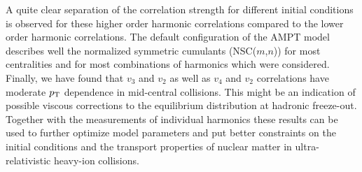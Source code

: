 A quite clear separation of the correlation strength for different initial conditions is observed for these higher order harmonic correlations compared to the lower order harmonic correlations.
The default configuration of the AMPT model describes well the normalized symmetric cumulants (NSC($m$,$n$)) for most centralities and for most combinations of harmonics which were considered. %
Finally, we have found that $v_3$ and $v_2$ as well as $v_4$ and $v_2$ correlations have moderate $p_{\rm T}$ dependence in mid-central collisions. This might be an indication of possible viscous corrections to the equilibrium distribution at hadronic freeze-out.
Together with the measurements of individual harmonics these results can be used to further optimize model parameters and put better constraints on the initial conditions and the transport properties of nuclear matter in ultra-relativistic heavy-ion collisions.






